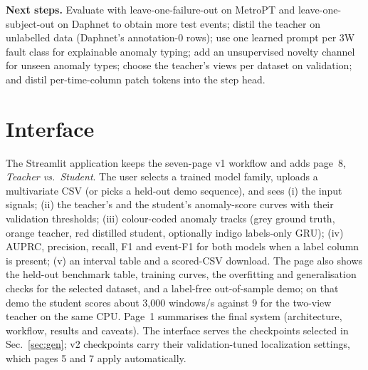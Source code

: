 \documentclass[twoside,english]{article}
\begin{document}
\textbf{Next steps.} Evaluate with leave-one-failure-out on MetroPT and leave-one-subject-out on Daphnet to obtain more test events; distil the teacher on unlabelled data (Daphnet's annotation-0 rows); use one learned prompt per 3W fault class for explainable anomaly typing; add an unsupervised novelty channel for unseen anomaly types; choose the teacher's views per dataset on validation; and distil per-time-column patch tokens into the step head.

\section{Interface}
The Streamlit application keeps the seven-page v1 workflow and adds page~8, \emph{Teacher vs.\ Student}. The user selects a trained model family, uploads a multivariate CSV (or picks a held-out demo sequence), and sees (i) the input signals; (ii) the teacher's and the student's anomaly-score curves with their validation thresholds; (iii) colour-coded anomaly tracks (grey ground truth, orange teacher, red distilled student, optionally indigo labels-only GRU); (iv) AUPRC, precision, recall, F1 and event-F1 for both models when a label column is present; (v) an interval table and a scored-CSV download. The page also shows the held-out benchmark table, training curves, the overfitting and generalisation checks for the selected dataset, and a label-free out-of-sample demo; on that demo the student scores about 3{,}000 windows/s against 9 for the two-view teacher on the same CPU. Page~1 summarises the final system (architecture, workflow, results and caveats). The interface serves the checkpoints selected in Sec.~\ref{sec:gen}; v2 checkpoints carry their validation-tuned localization settings, which pages 5 and 7 apply automatically.
\end{document}
